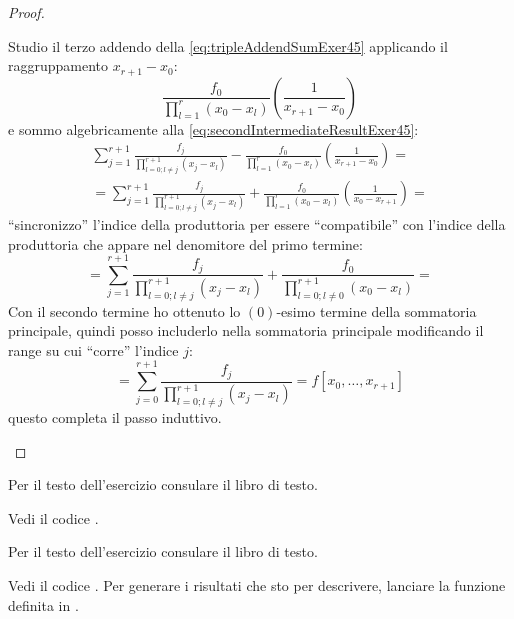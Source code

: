 \begin{proof}
\begin{enumerate}
\begin{itemize}
  	Studio il terzo addendo della \ref{eq:tripleAddendSumExer45} applicando il
  	raggruppamento $x_{r+1} - x_{0}$: 
  	\begin{displaymath}
  	\frac{f_{0}}{\prod_{l = 1}^{r}{(x_{0} - x_{l})}}  \left(\frac{1}{x_{r+1}
  	- x_{0}}\right)
  	\end{displaymath}
  	e sommo algebricamente alla \ref{eq:secondIntermediateResultExer45}:
  	\begin{displaymath}
  	\begin{split}
	  	\sum_{j = 1}^{r+1}{
	  		\frac{f_{j}}{\prod_{l = 0;l \not = j}^{r+1}{(x_{j} -
	  		x_{l})}}} -
	  	\frac{f_{0}}{\prod_{l = 1}^{r}{(x_{0} - x_{l})}}  \left(\frac{1}{x_{r+1}
	  	- x_{0}}\right) =	  	\\
	  	= \sum_{j = 1}^{r+1}{
	  		\frac{f_{j}}{\prod_{l = 0;l \not = j}^{r+1}{(x_{j} -
	  		x_{l})}}} +
	  	\frac{f_{0}}{\prod_{l = 1}^{r}{(x_{0} - x_{l})}}  \left(\frac{1}{x_{0}
	  	- x_{r+1}}\right) = 
  	\end{split}
  	\end{displaymath}
  	``sincronizzo'' l'indice della produttoria per essere ``compatibile'' 
  	con l'indice della produttoria che appare nel denomitore del primo termine:
  	\begin{displaymath}
	  	= \sum_{j = 1}^{r+1}{
	  		\frac{f_{j}}{\prod_{l = 0;l \not = j}^{r+1}{(x_{j} -
	  		x_{l})}}} +
	  	\frac{f_{0}}{\prod_{l = 0;l\not = 0}^{r+1}{(x_{0} - x_{l})}} = 
  	\end{displaymath}
  	Con il secondo termine ho ottenuto lo $(0)$-esimo termine della sommatoria
  	principale, quindi posso includerlo nella sommatoria principale
  	modificando il range su cui ``corre'' l'indice $j$:
  	\begin{equation}
  	\label{eq:thirdIntermediateResultExer45} 
  		= \sum_{j = 0}^{r+1}{
	  		\frac{f_{j}}{\prod_{l = 0;l \not = j}^{r+1}{(x_{j} -
	  		x_{l})}}} = f[x_{0}, \ldots, x_{r+1}]
	\end{equation}
  	questo completa il passo induttivo.
  \end{itemize}
\end{enumerate}
\end{proof}

\begin{exercise}[4.6]
Per il testo dell'esercizio consulare il libro di testo.
\end{exercise}
Vedi il codice .

\begin{exercise}[4.7]
Per il testo dell'esercizio consulare il libro di testo.
\end{exercise}
Vedi il codice . Per generare i risultati
che sto per descrivere, lanciare la funzione definita in
.

